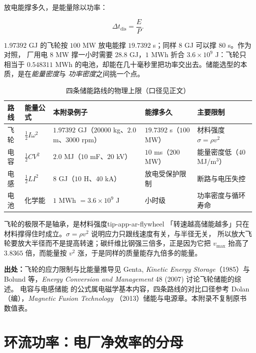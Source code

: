 放电能撑多久，是能量除以功率：

\begin{equation}
\Delta t_\mathrm{dis}=\frac{E}{P}.
\label{eq:app-ar-discharge}
\end{equation}

$1.97392$ GJ 的飞轮按 $100$ MW 放电能撑 $19.7392$ s；同样 $8$ GJ 可以撑 $80$ s。作为对照，
厂用电 $8$ MW 撑一小时需要 $28.8$ GJ，$1$ MWh 折合 $3.6\times10^{9}$ J：飞轮只相当于
$0.548311$ MWh 的电池，却能在几十毫秒里把功率交出去。储能选型的本质，是在\emph{能量密度}与
\emph{功率密度}之间挑一个点。

\begin{table}[htbp]
\centering
\small
\caption{四条储能路线的物理上限（口径见正文）}
\label{tab:app-ar-storage}
\begin{tabular}{p{1.9cm}p{2.4cm}p{2.6cm}p{2.6cm}p{3.4cm}}
\hline
路线 & 能量公式 & 本附录例子 & 能撑多久 & 主要限制 \\
\hline
飞轮 & $\tfrac12I\omega^2$ & $1.97392$ GJ（$20000$ kg、$2.0$ m、$3000$ rpm） & $19.7392$ s（$100$ MW） & 材料强度 $\sigma=\rho v^2$ \\
电容 & $\tfrac12CV^2$ & $2.0$ MJ（$10$ mF、$20$ kV） & $10$ ms（$200$ MW） & 能量密度低（$40$ MJ/m$^3$） \\
电感 & $\tfrac12LI^2$ & $8$ GJ（$10$ H、$40$ kA） & 放电受保护限制 & 断路与电压失控 \\
电池 & 化学能 & $1$ MWh $=3.6\times10^{9}$ J & 小时级 & 功率密度与循环寿命 \\
\hline
\end{tabular}
\end{table}

\begin{tip}{飞轮的极限不是轴承，是材料强度}{tip-app-ar-flywheel}
「转速越高储能越多」只在材料撑得住时成立。$\sigma=\rho v^2$ 说明应力只跟线速度有关，与半径无关，
所以放大飞轮要放大半径而不是提高转速；碳纤维比钢强三倍多，正是因为它把 $v_\mathrm{max}$ 抬高了
$3.8365$ 倍，而能量按 $v^2$ 涨，于是同样的质量能存九倍多的能量。
\end{tip}

{\small

\textbf{出处：}飞轮的应力限制与比能量推导见 Genta, \emph{Kinetic Energy Storage}（1985）与
Bolund 等，\emph{Energy Conversion and Management} 48 (2007) 讨论飞轮储能的综述。
电容与电感储能
的公式属电磁学基本内容，四条路线的对比口径参考 Dolan（编），\emph{Magnetic Fusion Technology}
（2013）储能与电源章。本附录不复制原书数值表。
}

\section{环流功率：电厂净效率的分母}
\label{sec:app-ar-recirculating}

